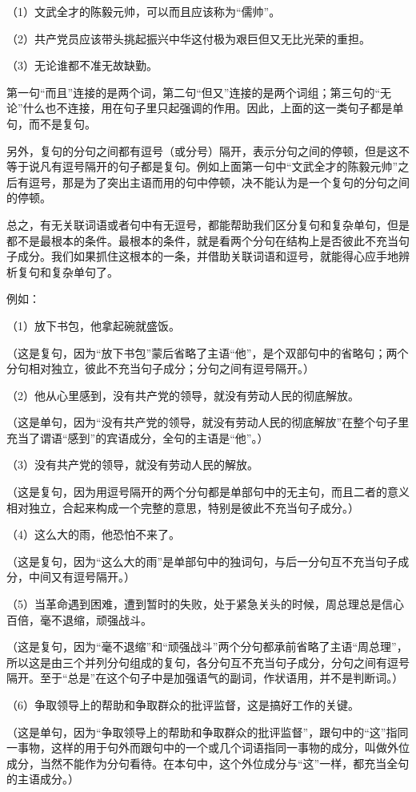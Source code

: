 （1）文武全才的陈毅元帅，可以而且应该称为“儒帅”。

（2）共产党员应该带头挑起振兴中华这付极为艰巨但又无比光荣的重担。

（3）无论谁都不准无故缺勤。

第一句“而且”连接的是两个词，第二句“但又”连接的是两个词组；第三句的“无论”什么也不连接，用在句子里只起强调的作用。因此，上面的这一类句子都是单句，而不是复句。

另外，复句的分句之间都有逗号（或分号）隔开，表示分句之间的停顿，但是这不等于说凡有逗号隔开的句子都是复句。例如上面第一句中“文武全才的陈毅元帅”之后有逗号，那是为了突出主语而用的句中停顿，决不能认为是一个复句的分句之间的停顿。

总之，有无关联词语或者句中有无逗号，都能帮助我们区分复句和复杂单句，但是都不是最根本的条件。最根本的条件，就是看两个分句在结构上是否彼此不充当句子成分。我们如果抓住这根本的一条，并借助关联词语和逗号，就能得心应手地辨析复句和复杂单句了。

例如：

（1）放下书包，他拿起碗就盛饭。

（这是复句，因为“放下书包”蒙后省略了主语“他”，是个双部句中的省略句；两个分句相对独立，彼此不充当句子成分；分句之间有逗号隔开。）

（2）他从心里感到，没有共产党的领导，就没有劳动人民的彻底解放。

（这是单句，因为“没有共产党的领导，就没有劳动人民的彻底解放”在整个句子里充当了谓语“感到”的宾语成分，全句的主语是“他”。）

（3）没有共产党的领导，就没有劳动人民的解放。

（这是复句，因为用逗号隔开的两个分句都是单部句中的无主句，而且二者的意义相对独立，合起来构成一个完整的意思，特别是彼此不充当句子成分。）

（4）这么大的雨，他恐怕不来了。

（这是复句，因为“这么大的雨”是单部句中的独词句，与后一分句互不充当句子成分，中间又有逗号隔开。）

（5）当革命遇到困难，遭到暂时的失败，处于紧急关头的时候，周总理总是信心百倍，毫不退缩，顽强战斗。

（这是复句，因为“毫不退缩”和“顽强战斗”两个分句都承前省略了主语“周总理”，所以这是由三个并列分句组成的复句，各分句互不充当句子成分，分句之间有逗号隔开。至于“总是”在这个句子中是加强语气的副词，作状语用，并不是判断词。）

（6）争取领导上的帮助和争取群众的批评监督，这是搞好工作的关键。

（这是单句，因为“争取领导上的帮助和争取群众的批评监督”，跟句中的“这”指同一事物，这样的用于句外而跟句中的一个或几个词语指同一事物的成分，叫做外位成分，当然不能作为分句看待。在本句中，这个外位成分与“这”一样，都充当全句的主语成分。）

